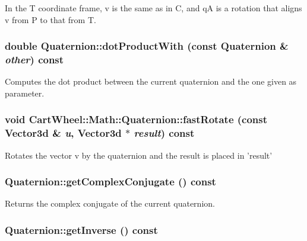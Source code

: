 In the T coordinate frame, v is the same as in C, and qA is a rotation that aligns v from P to that from T. \hypertarget{classCartWheel_1_1Math_1_1Quaternion_a515282eb35ee7fb50cbc179e96ce434c}{
\subsubsection[{dotProductWith}]{\setlength{\rightskip}{0pt plus 5cm}double Quaternion::dotProductWith (const {\bf Quaternion} \& {\em other}) const}}
\label{classCartWheel_1_1Math_1_1Quaternion_a515282eb35ee7fb50cbc179e96ce434c}
Computes the dot product between the current quaternion and the one given as parameter. \hypertarget{classCartWheel_1_1Math_1_1Quaternion_a78c391f21f30d1751909ee001778b4d9}{
\subsubsection[{fastRotate}]{\setlength{\rightskip}{0pt plus 5cm}void CartWheel::Math::Quaternion::fastRotate (const {\bf Vector3d} \& {\em u}, \/  {\bf Vector3d} $\ast$ {\em result}) const}}
\label{classCartWheel_1_1Math_1_1Quaternion_a78c391f21f30d1751909ee001778b4d9}
Rotates the vector v by the quaternion and the result is placed in 'result' \hypertarget{classCartWheel_1_1Math_1_1Quaternion_a601630e8a98e18fd1b8a43f2e845a9f4}{
\subsubsection[{getComplexConjugate}]{ Quaternion::getComplexConjugate () const}}
\label{classCartWheel_1_1Math_1_1Quaternion_a601630e8a98e18fd1b8a43f2e845a9f4}
Returns the complex conjugate of the current quaternion. \hypertarget{classCartWheel_1_1Math_1_1Quaternion_afe3c9a40a60ab64107d8dd7ab4228fce}{
\subsubsection[{getInverse}]{ Quaternion::getInverse () const}}
